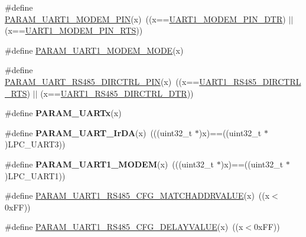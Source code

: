 \begin{DoxyCompactItemize}
\item 
\#define \hyperlink{group___u_a_r_t___private___macros_gae46654a5c2b0b2b3022c2633c4d12fc2}{\-P\-A\-R\-A\-M\-\_\-\-U\-A\-R\-T1\-\_\-\-M\-O\-D\-E\-M\-\_\-\-P\-I\-N}(x)~((x==\hyperlink{group___u_a_r_t___public___types_ggabfc7ec239b7d598e6a2cc163e66b76fcac831b7aff6c92cfb78dab2a0bf6bd97c}{\-U\-A\-R\-T1\-\_\-\-M\-O\-D\-E\-M\-\_\-\-P\-I\-N\-\_\-\-D\-T\-R}) $|$$|$ (x==\hyperlink{group___u_a_r_t___public___types_ggabfc7ec239b7d598e6a2cc163e66b76fcafb10c5304a783fa1d234d72a9d1ff056}{\-U\-A\-R\-T1\-\_\-\-M\-O\-D\-E\-M\-\_\-\-P\-I\-N\-\_\-\-R\-T\-S}))
\item 
\#define \hyperlink{group___u_a_r_t___private___macros_ga0e22549db0a3e5945249b23ae87eebbf}{\-P\-A\-R\-A\-M\-\_\-\-U\-A\-R\-T1\-\_\-\-M\-O\-D\-E\-M\-\_\-\-M\-O\-D\-E}(x)
\item 
\#define \hyperlink{group___u_a_r_t___private___macros_ga32e9aa7d2b33ee9fe74da664e2359b64}{\-P\-A\-R\-A\-M\-\_\-\-U\-A\-R\-T\-\_\-\-R\-S485\-\_\-\-D\-I\-R\-C\-T\-R\-L\-\_\-\-P\-I\-N}(x)~((x==\hyperlink{group___u_a_r_t___public___types_ggabcfaaf12f325112107ff9b5c5cf1120ca8f2c8ec98f2fb7e26516974a08fc2885}{\-U\-A\-R\-T1\-\_\-\-R\-S485\-\_\-\-D\-I\-R\-C\-T\-R\-L\-\_\-\-R\-T\-S}) $|$$|$ (x==\hyperlink{group___u_a_r_t___public___types_ggabcfaaf12f325112107ff9b5c5cf1120cad58cd4cd834d89b139816c0cd3138582}{\-U\-A\-R\-T1\-\_\-\-R\-S485\-\_\-\-D\-I\-R\-C\-T\-R\-L\-\_\-\-D\-T\-R}))
\item 
\#define {\bfseries \-P\-A\-R\-A\-M\-\_\-\-U\-A\-R\-Tx}(x)
\item 
\hypertarget{group___u_a_r_t___private___macros_ga8af9d466136018be41f1d1280c11197a}{\#define {\bfseries \-P\-A\-R\-A\-M\-\_\-\-U\-A\-R\-T\-\_\-\-Ir\-D\-A}(x)~(((uint32\-\_\-t $\ast$)x)==((uint32\-\_\-t $\ast$)\-L\-P\-C\-\_\-\-U\-A\-R\-T3))}\label{group___u_a_r_t___private___macros_ga8af9d466136018be41f1d1280c11197a}

\item 
\hypertarget{group___u_a_r_t___private___macros_ga498a6ee60a8998e7d7c70951b599c520}{\#define {\bfseries \-P\-A\-R\-A\-M\-\_\-\-U\-A\-R\-T1\-\_\-\-M\-O\-D\-E\-M}(x)~(((uint32\-\_\-t $\ast$)x)==((uint32\-\_\-t $\ast$)\-L\-P\-C\-\_\-\-U\-A\-R\-T1))}\label{group___u_a_r_t___private___macros_ga498a6ee60a8998e7d7c70951b599c520}

\item 
\#define \hyperlink{group___u_a_r_t___private___macros_ga3d303c3150afe21e6b740f0a06c5d689}{\-P\-A\-R\-A\-M\-\_\-\-U\-A\-R\-T1\-\_\-\-R\-S485\-\_\-\-C\-F\-G\-\_\-\-M\-A\-T\-C\-H\-A\-D\-D\-R\-V\-A\-L\-U\-E}(x)~((x$<$0x\-F\-F))
\item 
\#define \hyperlink{group___u_a_r_t___private___macros_ga412ed900bb9130582236c4402ef5b501}{\-P\-A\-R\-A\-M\-\_\-\-U\-A\-R\-T1\-\_\-\-R\-S485\-\_\-\-C\-F\-G\-\_\-\-D\-E\-L\-A\-Y\-V\-A\-L\-U\-E}(x)~((x$<$0x\-F\-F))
\end{DoxyCompactItemize}


